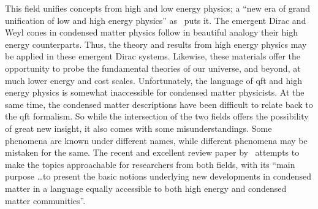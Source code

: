 This field unifies concepts from high and low energy physics;
a ``new era of grand unification of low and high energy physics'' as~\textcite{chernodubThermalTransportGeometry2021} puts it.
The emergent Dirac and Weyl cones in condensed matter physics follow in beautiful analogy their high energy counterparts.
Thus, the theory and results from high energy physics may be applied in these emergent Dirac systems.
Likewise, these materials offer the opportunity to probe the fundamental theories of our universe, and beyond, at much lower energy and cost scales.
Unfortunately, the language of \gls{qft} and high energy physics is somewhat inaccessible for condensed matter physicists.
At the same time, the condensed matter descriptions have been difficult to relate back to the \gls{qft} formalism.
So while the intersection of the two fields offers the possibility of great new insight, it also comes with some misunderstandings.
Some phenomena are known under different names, while different phenomena may be mistaken for the same.
The recent and excellent review paper by~\textcite{chernodubThermalTransportGeometry2021} attempts to make the topics approachable for researchers from both fields, with its ``main purpose \dots to present the basic notions underlying new developments in condensed matter in a language equally accessible to both high energy and condensed matter communities''.

